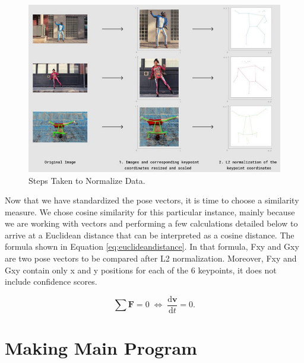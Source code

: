 \begin{figure}[ht]
  \centering
  \includegraphics[scale=0.9]{gambar/two-steps.png}
  \caption{Steps Taken to Normalize Data.}
  \label{fig:steps-to-normalize}
\end{figure}

Now that we have standardized the pose vectors, it is time to choose a similarity measure. We chose cosine similarity for this particular instance, mainly because we are working with vectors and performing a few calculations detailed below to arrive at a Euclidean distance that can be interpreted as a cosine distance. The formula shown in Equation \ref{eq:euclideandistance}.
In that formula, Fxy and Gxy are two pose vectors to be compared after L2 normalization. Moreover, Fxy and Gxy contain only x and y positions for each of the 6 keypoints, it does not include confidence scores.

\begin{equation}
  \label{eq:euclideandistance}
  \sum \mathbf{F} = 0\; \Leftrightarrow\; \frac{\mathrm{d} \mathbf{v} }{\mathrm{d}t} = 0.
\end{equation}

\section{Making Main Program}
\label{sec:makingmainprogram}